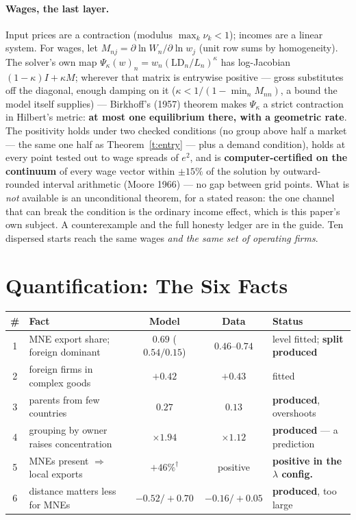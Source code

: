 \documentclass[10pt]{article}
\theoremstyle{plain}
\begin{document}
\paragraph{Wages, the last layer.} Input prices are a contraction (modulus
$\max_k\nu_k<1$); incomes are a linear system. For wages, let
$M_{nj}=\partial\ln W_n/\partial\ln w_j$ (unit row sums by homogeneity). The solver's
own map $\Psi_\kappa(w)_n=w_n(\mathrm{LD}_n/L_n)^\kappa$ has log-Jacobian
$(1-\kappa)I+\kappa M$; wherever that matrix is entrywise positive --- gross
substitutes off the diagonal, enough damping on it ($\kappa<1/(1-\min_nM_{nn})$, a
bound the model itself supplies) --- Birkhoff's (1957) theorem makes $\Psi_\kappa$ a
strict contraction in Hilbert's metric: \textbf{at most one equilibrium there, with a
geometric rate}. The positivity holds under two checked conditions (no group above
half a market --- the same one half as Theorem~\ref{t:entry} --- plus a demand
condition), holds at every point tested out to wage spreads of $e^2$, and is
\textbf{computer-certified on the continuum} of every wage vector within $\pm15\%$ of
the solution by outward-rounded interval arithmetic (Moore 1966) --- no gap between
grid points. What is \emph{not} available is an unconditional theorem, for a stated
reason: the one channel that can break the condition is the ordinary income effect,
which is this paper's own subject. A counterexample and the full honesty ledger are
in the guide. Ten dispersed starts reach the same wages \emph{and the same set of
operating firms}.

\section{Quantification: The Six Facts}

\begin{center}\footnotesize
\begin{tabular}{clccl}
\toprule
\# & Fact & Model & Data & Status\\
\midrule
1 & MNE export share; foreign dominant & $0.69$ ($0.54/0.15$) & $0.46$--$0.74$ & level fitted; \textbf{split produced}\\
2 & foreign firms in complex goods & $+0.42$ & $+0.43$ & fitted\\
3 & parents from few countries & $0.27$ & $0.13$ & \textbf{produced}, overshoots\\
4 & grouping by owner raises concentration & $\times1.94$ & $\times1.12$ & \textbf{produced} --- a prediction\\
5 & MNEs present $\Rightarrow$ local exports & $+46\%^{\dagger}$ & positive & \textbf{positive in the $\lambda$ config.}\\
6 & distance matters less for MNEs & $-0.52/{+}0.70$ & $-0.16/{+}0.05$ & \textbf{produced}, too large\\
\bottomrule
\end{tabular}
\end{center}
\end{document}
